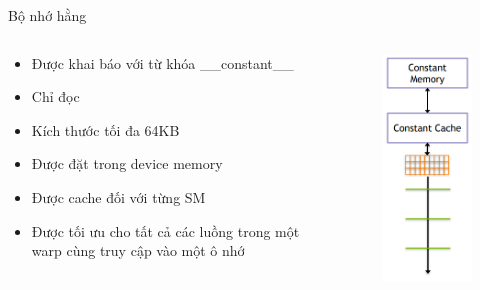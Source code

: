 \documentclass[10pt]{beamer}
\theoremstyle{remark}
\numberwithin{algocf}{section}
\numberwithin{equation}{section}
\numberwithin{dl}{section}
\numberwithin{figure}{section}
\begin{document}
\begin{frame}{Bộ nhớ hằng}
    \begin{columns}[onlytextwidth]
        \begin{column}{0.5\linewidth}
            \begin{itemize}
                \item Được khai báo với từ khóa \_\_constant\_\_
                \item Chỉ đọc 
                \item Kích thước tối đa 64KB
                \item Được đặt trong device memory
                \item Được cache đối với từng SM
                \item Được tối ưu cho tất cả các luồng trong một warp cùng truy cập vào một ô nhớ
            \end{itemize}
        \end{column}
        \begin{column}{0.5\linewidth}
            \begin{figure}[H]
                \centering
                \includegraphics[width=0.4\linewidth]{figures/CUDA/GPU_Constant_Memory.png} 
            \end{figure}
        \end{column}
    \end{columns}
\end{frame}
\end{document}
